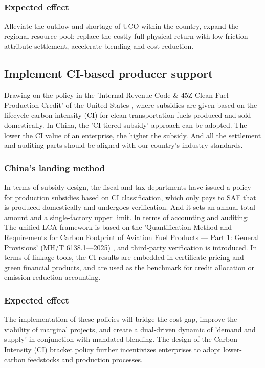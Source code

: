 \documentclass[a4paper,11pt]{article}
\begin{document}
\subsubsection{Expected effect}
Alleviate the outflow and shortage of UCO within the country, expand the regional resource pool; replace the costly full physical return with low-friction attribute settlement, accelerate blending and cost reduction.

\subsection{Implement CI-based producer support}
Drawing on the policy in the 'Internal Revenue Code \& 45Z Clean Fuel Production Credit' of the United States \cite{irs2025}, where subsidies are given based on the lifecycle carbon intensity (CI) for clean transportation fuels produced and sold domestically. In China, the 'CI tiered subsidy' approach can be adopted. The lower the CI value of an enterprise, the higher the subsidy. And all the settlement and auditing parts should be aligned with our country's industry standards.

\subsubsection{China's landing method}
In terms of subsidy design, the fiscal and tax departments have issued a policy for production subsidies based on CI classification, which only pays to SAF that is produced domestically and undergoes verification. And it sets an annual total amount and a single-factory upper limit. In terms of accounting and auditing: The unified LCA framework is based on the 'Quantification Method and Requirements for Carbon Footprint of Aviation Fuel Products --- Part 1: General Provisions' (MH/T 6138.1---2025) \cite{caac2025}, and third-party verification is introduced. In terms of linkage tools, the CI results are embedded in certificate pricing and green financial products, and are used as the benchmark for credit allocation or emission reduction accounting.

\subsubsection{Expected effect}
The implementation of these policies will bridge the cost gap, improve the viability of marginal projects, and create a dual-driven dynamic of 'demand and supply' in conjunction with mandated blending. The design of the Carbon Intensity (CI) bracket policy further incentivizes enterprises to adopt lower-carbon feedstocks and production processes.
\end{document}
